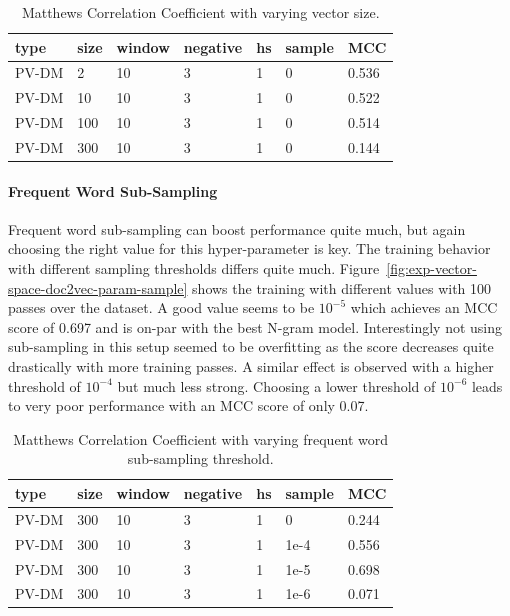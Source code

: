 \begin{table}[h]
  \begin{center}
  \begin{tabular}{ *6l | l }
    \toprule
    type & size & window & negative & hs & sample & MCC  \\
    \midrule
    PV-DM & 2   & 10 & 3 & 1 & 0 & 0.536 \\
    PV-DM & 10  & 10 & 3 & 1 & 0 & 0.522 \\
    PV-DM & 100 & 10 & 3 & 1 & 0 & 0.514 \\
    PV-DM & 300 & 10 & 3 & 1 & 0 & 0.144 \\
    \bottomrule
  \end{tabular}
  \caption{Matthews Correlation Coefficient with varying vector size.}
\label{tab:Paragraph Vector Parameter Results Size}
\end{center}
\end{table}

\paragraph{Frequent Word Sub-Sampling}
Frequent word sub-sampling can boost performance quite much, but again choosing the right value for this hyper-parameter is key. The training behavior with different sampling thresholds differs quite much. Figure~\ref{fig:exp-vector-space-doc2vec-param-sample} shows the training with different values with 100 passes over the dataset. A good value seems to be $10^{-5}$ which achieves an MCC score of 0.697 and is on-par with the best N-gram model. Interestingly not using sub-sampling in this setup seemed to be overfitting as the score decreases quite drastically with more training passes. A similar effect is observed with a higher threshold of $10^{-4}$ but much less strong. Choosing a lower threshold of $10^{-6}$ leads to very poor performance with an MCC score of only 0.07.

\begin{table}[h]
  \begin{center}
  \begin{tabular}{ *6l | l }
    \toprule
    type & size & window & negative & hs & sample & MCC  \\
    \midrule
    PV-DM & 300 & 10 & 3 & 1 & 0 & 0.244 \\
    PV-DM & 300 & 10 & 3 & 1 & 1e-4 & 0.556 \\
    PV-DM & 300 & 10 & 3 & 1 & 1e-5 & 0.698 \\
    PV-DM & 300 & 10 & 3 & 1 & 1e-6 & 0.071 \\
    \bottomrule
  \end{tabular}
  \caption{Matthews Correlation Coefficient with varying frequent word sub-sampling threshold.}
\label{tab:Paragraph Vector Parameter Results Sample}
\end{center}
\end{table}

